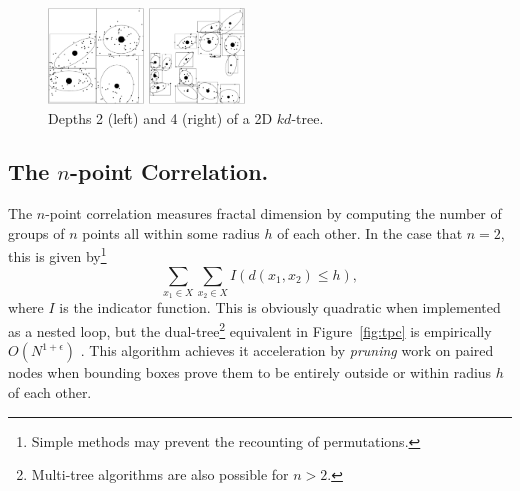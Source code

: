 \documentclass[twoside,leqno,twocolumn]{article}
\begin{document}
\begin{figure}[tb]
  \begin{center}
    \begin{minipage}{1.05in}
      \includegraphics[width=1.0in]{kdtree-level2.ps}
    \end{minipage}
    \begin{minipage}{1.05in}
      \includegraphics[width=1.0in]{kdtree-level4.ps}
    \end{minipage}
    \begin{minipage}{1.05in}
      \caption{\label{fig:kd-trees}\footnotesize Depths 2 (left) and 4
	(right) of a 2D $kd$-tree.}
    \end{minipage}
  \end{center}
  \vspace{-10pt}
\end{figure}

\subsection{The $n$-point Correlation.}
The $n$-point correlation measures fractal dimension by computing the
number of groups of $n$ points all within some radius $h$ of each
other.  In the case that $n = 2$, this is given by\footnote{Simple
methods may prevent the recounting of permutations.}
\begin{equation}
  \sum_{x_1 \in X} \sum_{x_2 \in X} I(d(x_1,x_2) \leq h) ,
\end{equation}
where $I$ is the indicator function.  This is obviously quadratic when
implemented as a nested loop, but the dual-tree\footnote{Multi-tree
algorithms are also possible for $n > 2$.} equivalent in
Figure~\ref{fig:tpc} is empirically $O(N^{1+\epsilon})$
\cite{nips2000paper}.  This algorithm achieves it acceleration by {\em
pruning} work on paired nodes when bounding boxes prove them to be
entirely outside or within radius $h$ of each other.
\end{document}
